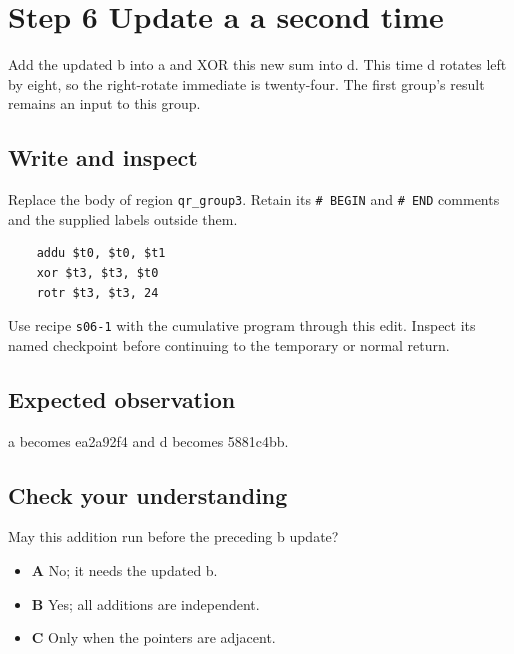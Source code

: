 \section{Step 6 Update a a second time}\label{chacha-s06}

Add the updated b into a and XOR this new sum into d. This time d rotates left by eight, so the right-rotate immediate is twenty-four. The first group's result remains an input to this group.

\subsection{Write and inspect}
Replace the body of region \texttt{qr\_group3}. Retain its \texttt{\# BEGIN} and \texttt{\# END} comments and the supplied labels outside them.

\begin{verbatim}
    addu $t0, $t0, $t1
    xor $t3, $t3, $t0
    rotr $t3, $t3, 24
\end{verbatim}

Use recipe \texttt{s06-1} with the cumulative program through this edit. Inspect its named checkpoint before continuing to the temporary or normal return.

\subsection{Expected observation}
a becomes ea2a92f4 and d becomes 5881c4bb.

\subsection{Check your understanding}
May this addition run before the preceding b update?

\begin{itemize}
\item \textbf{A} No; it needs the updated b.
\item \textbf{B} Yes; all additions are independent.
\item \textbf{C} Only when the pointers are adjacent.
\end{itemize}

